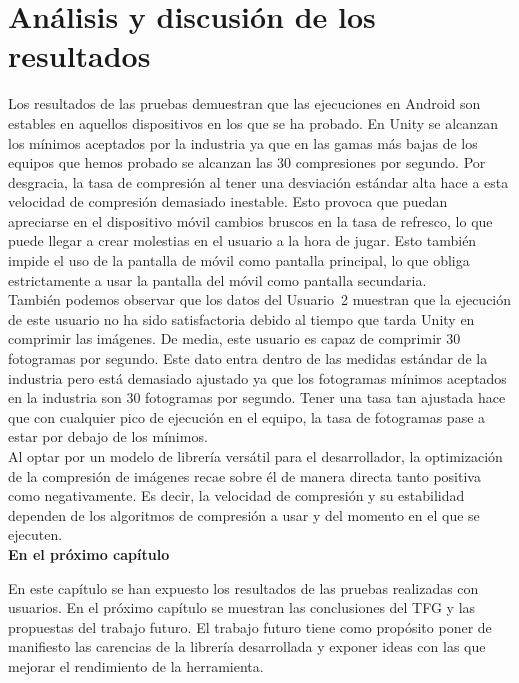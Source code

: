 \section{An\'alisis y discusi\'on de los resultados}
Los resultados de las pruebas demuestran que las ejecuciones en Android son estables en aquellos dispositivos en los que se ha probado. En Unity se alcanzan los m\'inimos aceptados por la industria ya que en las gamas m\'as bajas de los equipos que hemos probado se alcanzan las 30 compresiones por segundo. Por desgracia, la tasa de compresi\'on al tener una desviaci\'on est\'andar alta hace a esta velocidad de compresi\'on demasiado inestable. Esto provoca que puedan apreciarse en el dispositivo m\'ovil cambios bruscos en la tasa de refresco, lo que puede llegar a crear molestias en el usuario a la hora de jugar. Esto tambi\'en impide el uso de la pantalla de m\'ovil como pantalla principal, lo que obliga estrictamente a usar la pantalla del m\'ovil como pantalla secundaria.\\

Tambi\'en podemos observar que los datos del Usuario~2 muestran que la ejecuci\'on de este usuario no ha sido satisfactoria debido al tiempo que tarda Unity en comprimir las im\'agenes. De media, este usuario es capaz de comprimir 30 fotogramas por segundo. Este dato entra dentro de las medidas est\'andar de la industria pero est\'a demasiado ajustado ya que los fotogramas m\'inimos aceptados en la industria son 30 fotogramas por segundo. Tener una tasa tan ajustada hace que con cualquier pico de ejecuci\'on en el equipo, la tasa de fotogramas pase a estar por debajo de los m\'inimos.\\

Al optar por un modelo de librer\'ia vers\'atil para el desarrollador, la optimizaci\'on de la compresi\'on de im\'agenes recae sobre \'el de manera directa tanto positiva como negativamente. Es decir, la velocidad de compresi\'on y su estabilidad dependen de los algoritmos de compresi\'on a usar y del momento en el que se ejecuten.\\

\bigskip
\Large{\textbf{En el pr\'oximo cap\'itulo}}\\
\normalsize

En este cap\'itulo se han expuesto los resultados de las pruebas realizadas con usuarios. En el pr\'oximo cap\'itulo se muestran las conclusiones del TFG y las propuestas del trabajo futuro. El trabajo futuro tiene como prop\'osito poner de manifiesto las carencias de la librer\'ia desarrollada y exponer ideas con las que mejorar el rendimiento de la herramienta.\\

